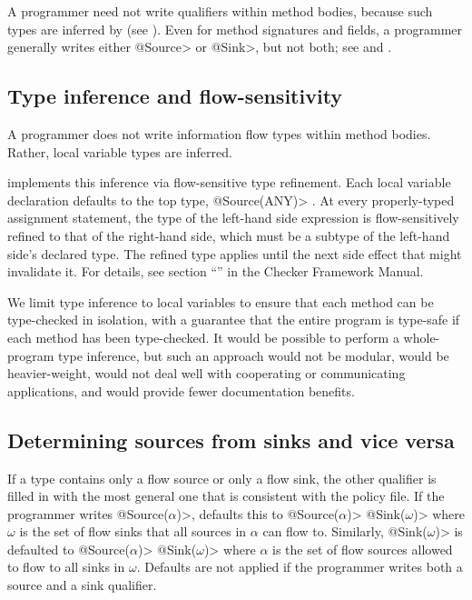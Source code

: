 A programmer need not write qualifiers within method bodies,
 because such types are inferred by \theFlowChecker (see ).
 Even for method signatures and
 fields, a programmer generally writes either \<@Source> or
 \<@Sink>, but not both; see  and 
.
\subsection{Type inference and flow-sensitivity}
\label{sec:type-inference}

A programmer does not write information flow types within method bodies.  Rather, local
variable types are inferred.

\TheFlowChecker implements this inference via flow-sensitive type refinement.
Each local variable declaration defaults to
the top type, \<@Source(ANY)> \srcnone.
At every properly-typed assignment statement, the type of the left-hand side
expression is
flow-sensitively refined to that of the right-hand side, which must be a
subtype of the left-hand side's declared type.
The refined type applies until the next side effect that might invalidate
it.   For
details, see section ``'' in the Checker Framework Manual.


We limit type inference to local variables to ensure that
each method can be type-checked in isolation,
with a guarantee that the entire program is type-safe if each method has
been type-checked.  It would be possible to perform a whole-program type
inference, but such an approach would not be modular, would be
heavier-weight, would not deal well with cooperating or communicating
applications, and would provide fewer documentation benefits.  


\subsection{Determining sources from sinks and vice versa}
\label{sec:infer-from-flow-policy}

If a type contains only a flow source or only a flow sink, the other qualifier is
filled in with the most general one that is consistent
with the policy file.
%
If the programmer writes 
\<@Source($\alpha$)>, \theFlowChecker defaults this to
\<@Source($\alpha$)> \<@Sink($\omega$)> where $\omega$ is the
set of flow sinks that all sources in $\alpha$ can flow to.
%
Similarly,
\<@Sink($\omega$)> is defaulted to
\<@Source($\alpha$)> \<@Sink($\omega$)> where $\alpha$ is the
set of flow sources allowed to flow to all sinks in $\omega$.
%
Defaults are not applied if the programmer writes both a source and a
sink qualifier.

